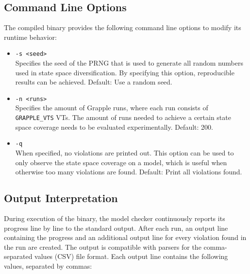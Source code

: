 \documentclass[
fancyheadings, %
%
%
]{stsreprt}
\begin{document}
\subsection{Command Line Options}
\label{section:implementation:cli-options}

The compiled binary provides the following command line options to modify its runtime behavior:

\begin{itemize}
    \item \texttt{-s <seed>} \\
          Specifies the seed of the PRNG that is used to generate all random numbers used in state space diversification.
          By specifying this option, reproducible results can be achieved.
          Default: Use a random seed.

    \item \texttt{-n <runs>} \\
          Specifies the amount of Grapple runs, where each run consists of \texttt{GRAPPLE\_VTS} VTs.
          The amount of runs needed to achieve a certain state space coverage needs to be evaluated experimentally.
          Default: 200.

    \item \texttt{-q} \\
          When specified, no violations are printed out.
          This option can be used to only observe the state space coverage on a model, which is useful when otherwise too many violations are found.
          Default: Print all violations found.
\end{itemize}

\subsection{Output Interpretation}
\label{section:implementation:output-interpretation}

During execution of the binary, the model checker continuously reports its progress line by line to the standard output.
After each run, an output line containing the progress and an additional output line for every violation found in the run are created.
The output is compatible with parsers for the comma-separated values (CSV) file format.
Each output line contains the following values, separated by commas:
\end{document}
